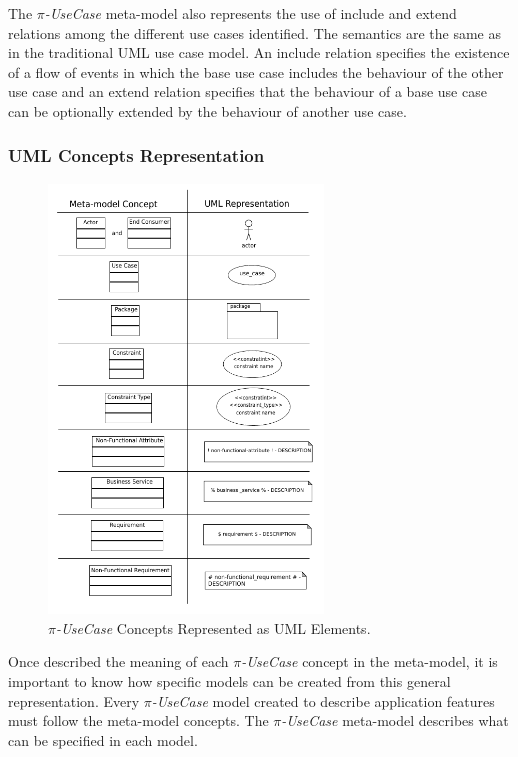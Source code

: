 The \textit{$\pi$-UseCase} meta-model
also represents the use of include and extend relations among the different use
cases identified. The semantics are the same as in the traditional UML use case
model. An include relation specifies the existence of a flow of events in which
the base use case includes the behaviour of the other use case and an extend
relation specifies that the behaviour of a base use case can be optionally
extended by the behaviour of another use case.
 

 \subsubsection{UML Concepts Representation} 
  

\begin{figure}[ht!]
\centering
\includegraphics[width=0.65\textwidth]{chapters/methodology/figs/umlRepresentation.pdf}
\caption{\textit{$\pi$-UseCase} Concepts Represented as UML Elements.}
\label{fig:umlrepresentation}
\end{figure}

Once described the meaning of each \textit{$\pi$-UseCase} concept in the
meta-model, it is important to know how specific models can be
created from this general representation. Every \textit{$\pi$-UseCase} model
created to describe application features must follow the
meta-model concepts. The \textit{$\pi$-UseCase} meta-model describes what can be
specified in each model.

